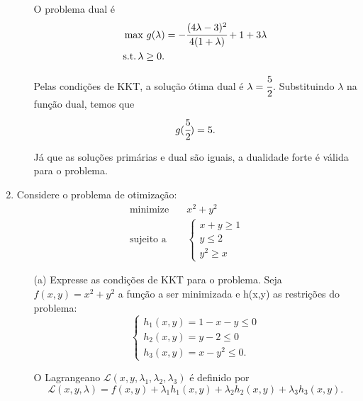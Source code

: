 \documentclass[11pt,a4paper]{article}
\begin{document}
\begin{enumerate}
\begin{itemize}
            O problema dual é
            \begin{equation*}
                \begin{aligned}
                    & \max \, g(\lambda) = -\cfrac{(4\lambda - 3)^2}{4(1 + \lambda)} + 1 + 3\lambda\\
                    & \text{s.t.} \, \lambda \geq 0.
                \end{aligned}
            \end{equation*}

            Pelas condições de KKT, a solução ótima dual é $\lambda = \cfrac{5}{2}$. Substituindo $\lambda$ na função dual, temos que
            \begin{equation*}
                g(\cfrac{5}{2}) = 5.
            \end{equation*}

            Já que as soluções primárias e dual são iguais, a dualidade forte é válida para o problema. 

        \end{itemize}
    \item Considere o problema de otimização:
        \begin{align*}
            \text{minimize} & \quad x^2 + y^2\\
            \text{sujeito a} & \quad \begin{cases}
                x + y \geq 1\\
                y \leq 2\\
                y^2 \geq x
            \end{cases}
        \end{align*}
        \begin{itemize}
            \item[(a)] Expresse as condições de KKT para o problema.
            Seja $f(x,y) = x^2 + y^2$ a função a ser minimizada e h(x,y) as restrições do problema:
            \begin{equation*}
                \begin{cases}
                    h_1(x,y) = 1 - x - y \leq 0\\
                    h_2(x,y) = y - 2 \leq 0\\
                    h_3(x,y) = x - y^2 \leq 0.
                \end{cases}
            \end{equation*}
            
            O Lagrangeano $\mathcal{L}(x, y, \lambda_1, \lambda_2, \lambda_3)$ é definido por
            \begin{equation*}
                \mathcal{L}(x,y,\lambda) = f(x,y) + \lambda_1h_1(x,y) + \lambda_2h_2(x,y) + \lambda_3h_3(x,y).
            \end{equation*}


\end{itemize}
\end{enumerate}
\end{document}
